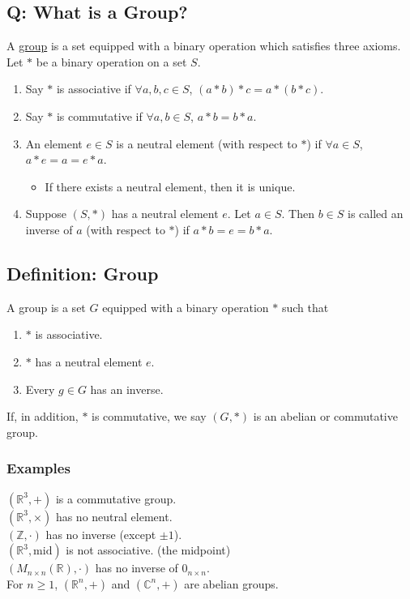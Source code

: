 \documentclass[11pt]{article}
\newcommand{\0}{\emptyset}
\newcommand{\Z}{\mathbb{Z}}
\newcommand{\R}{\mathbb{R}}
\newcommand{\C}{\mathbb{C}}
\begin{document}
\subsection*{Q: What is a Group?}
\label{sec:org54ee963}
A \href{../Definitions/group.org}{group} is a set equipped with a binary operation which satisfies three axioms.\\[0pt]
Let \(*\) be a binary operation on a set \(S\).\\[0pt]
\begin{enumerate}
\item Say \(*\) is associative if \(\forall a,b,c\in S\), \((a*b)*c=a*(b*c)\).\\[0pt]
\item Say \(*\) is commutative if \(\forall a,b\in S\), \(a*b=b*a\).\\[0pt]
\item An element \(e\in S\) is a neutral element (with respect to \(*\)) if \(\forall a\in S\), \(a*e=a=e*a\).\\[0pt]
\begin{itemize}
\item If there exists a neutral element, then it is unique.\\[0pt]
\end{itemize}
\item Suppose \((S,*)\) has a neutral element \(e\). Let \(a\in S\). Then \(b\in S\) is called an inverse of \(a\) (with respect to \(*\)) if \(a*b=e=b*a\).\\[0pt]
\end{enumerate}
\subsection*{Definition: Group}
\label{sec:orgc7c0a59}
A group is a set \(G\) equipped with a binary operation \(*\) such that\\[0pt]
\begin{enumerate}
\item \(*\) is associative.\\[0pt]
\item \(*\) has a neutral element \(e\).\\[0pt]
\item Every \(g\in G\) has an inverse.\\[0pt]
\end{enumerate}
If, in addition, \(*\) is commutative, we say \((G,*)\) is an abelian or commutative group.\\[0pt]
\subsubsection*{Examples}
\label{sec:org8a5cf31}
\((\R^{3},+)\) is a commutative group.\\[0pt]
\((\R^{3},\times)\) has no neutral element.\\[0pt]
\((\Z,\cdot)\) has no inverse (except \(\pm 1\)).\\[0pt]
\((\R^{3},\text{mid})\) is not associative. (the midpoint)\\[0pt]
\((M_{n\times n}(\R),\cdot)\) has no inverse of \(0_{n\times n}\).\\[0pt]
For \(n\geq 1\), \((\R^{n},+)\) and \((\C^{n},+)\) are abelian groups.\\[0pt]
\end{document}
